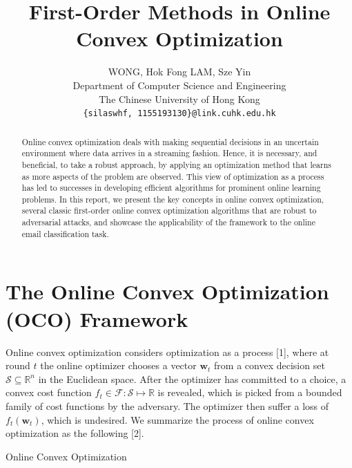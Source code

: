 \documentclass{article}
\title{First-Order Methods in Online Convex Optimization}
\author{%
  WONG, Hok Fong \quad LAM, Sze Yin\\
  Department of Computer Science and Engineering\\
  The Chinese University of Hong Kong\\
  \texttt{\{silaswhf, 1155193130\}@link.cuhk.edu.hk} \\
}
\begin{document}
\IncMargin{1.5em}

\maketitle


\begin{abstract}
  Online convex optimization deals with making sequential decisions in an uncertain environment where data arrives in a streaming fashion.
  Hence, it is necessary, and beneficial, to take a robust approach, by applying an optimization method that learns as more aspects of the problem are observed.
  This view of optimization as a process has led to successes in developing efficient algorithms for prominent online learning problems.
  In this report, we present the key concepts in online convex optimization, several classic first-order online convex optimization algorithms that are robust to adversarial attacks, and showcase the applicability of the framework to the online email classification task.
\end{abstract}


\section{The Online Convex Optimization (OCO) Framework}

Online convex optimization considers optimization as a process [1], where at round $t$ the online optimizer chooses a vector $\textbf{w}_t$ from a convex decision set $\mathcal{S}\subseteq \mathbb{R}^n$ in the Euclidean space.
After the optimizer has committed to a choice, a convex cost function $f_t\in \mathcal{F}: \mathcal{S}\mapsto \mathbb{R}$ is revealed, which is picked from a bounded family of cost functions by the adversary.
The optimizer then suffer a loss of $f_t(\textbf{w}_t)$, which is undesired. We summarize the process of online convex optimization as the following [2].


\begin{algorithm}[H]
  \caption{Online Convex Optimization}
\end{algorithm}

\end{document}
